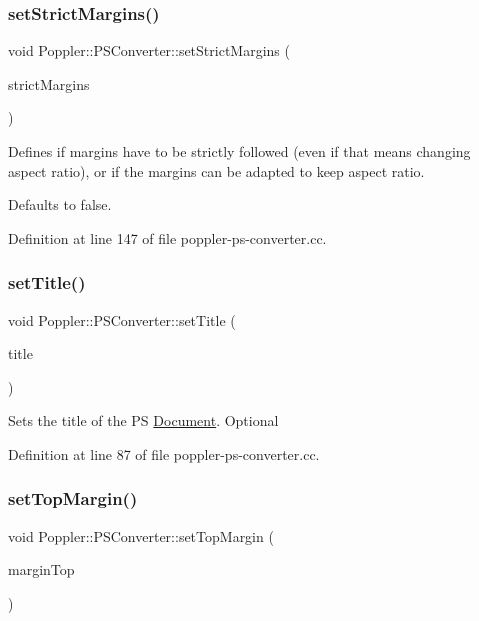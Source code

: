 \subsubsection{\texorpdfstring{set\+Strict\+Margins()}{setStrictMargins()}}
{\footnotesize\ttfamily void Poppler\+::\+P\+S\+Converter\+::set\+Strict\+Margins (\begin{DoxyParamCaption}\item[{bool}]{strict\+Margins }\end{DoxyParamCaption})}

Defines if margins have to be strictly followed (even if that means changing aspect ratio), or if the margins can be adapted to keep aspect ratio.

Defaults to false. 

Definition at line 147 of file poppler-\/ps-\/converter.\+cc.

\mbox{\label{class_poppler_1_1_p_s_converter_aa88fc3e34646758809472acee3987624}} 
\subsubsection{\texorpdfstring{set\+Title()}{setTitle()}}
{\footnotesize\ttfamily void Poppler\+::\+P\+S\+Converter\+::set\+Title (\begin{DoxyParamCaption}\item[{const Q\+String \&}]{title }\end{DoxyParamCaption})}

Sets the title of the PS \hyperlink{class_poppler_1_1_document}{Document}. Optional 

Definition at line 87 of file poppler-\/ps-\/converter.\+cc.

\mbox{\label{class_poppler_1_1_p_s_converter_a59403e5586a27c147885ca1cb03e2fa5}} 
\subsubsection{\texorpdfstring{set\+Top\+Margin()}{setTopMargin()}}
{\footnotesize\ttfamily void Poppler\+::\+P\+S\+Converter\+::set\+Top\+Margin (\begin{DoxyParamCaption}\item[{int}]{margin\+Top }\end{DoxyParamCaption})}

